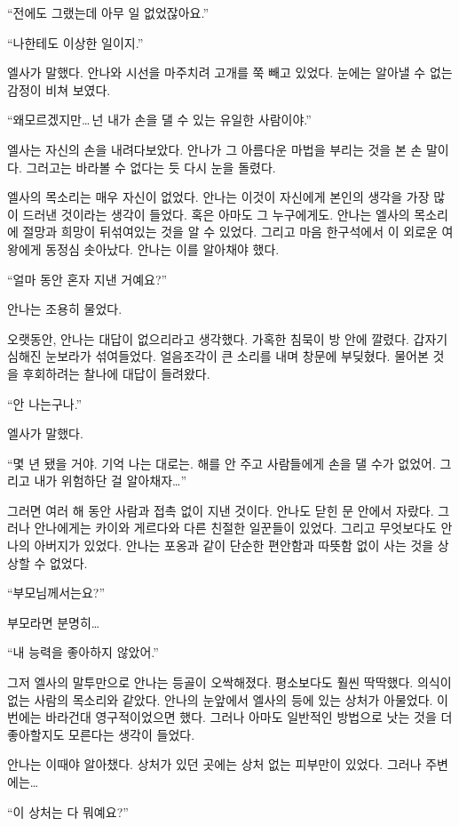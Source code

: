 ``전에도 그랬는데 아무 일 없었잖아요.''

``나한테도 이상한 일이지.''

엘사가 말했다. 안나와 시선을 마주치려 고개를 쭉 빼고 있었다. 눈에는 알아낼 수 없는 감정이 비쳐 보였다.

``왜 모르겠지만\ldots\,넌 내가 손을 댈 수 있는 유일한 사람이야.''

엘사는 자신의 손을 내려다보았다. 안나가 그 아름다운 마법을 부리는 것을 본 손 말이다. 그러고는 바라볼 수 없다는 듯 다시 눈을 돌렸다.

엘사의 목소리는 매우 자신이 없었다. 안나는 이것이 자신에게 본인의 생각을 가장 많이 드러낸 것이라는 생각이 들었다. 혹은 아마도 그 누구에게도. 안나는 엘사의 목소리에 절망과 희망이 뒤섞여있는 것을 알 수 있었다. 그리고 마음 한구석에서 이 외로운 여왕에게 동정심 솟아났다. 안나는 이를 알아채야 했다.

``얼마 동안 혼자 지낸 거예요?''

안나는 조용히 물었다.

오랫동안, 안나는 대답이 없으리라고 생각했다. 가혹한 침묵이 방 안에 깔렸다. 갑자기 심해진 눈보라가 섞여들었다. 얼음조각이 큰 소리를 내며 창문에 부딪혔다. 물어본 것을 후회하려는 찰나에 대답이 들려왔다.

`` 안 나는구나.''

엘사가 말했다.

``몇 년 됐을 거야. 기억 나는 대로는. 해를 안 주고 사람들에게 손을 댈 수가 없었어. 그리고 내가 위험하단 걸 알아채자\ldots''

그러면 여러 해 동안 사람과 접촉 없이 지낸 것이다. 안나도 닫힌 문 안에서 자랐다. 그러나 안나에게는 카이와 게르다와 다른 친절한 일꾼들이 있었다. 그리고 무엇보다도 안나의 아버지가 있었다. 안나는 포옹과 같이 단순한 편안함과 따뜻함 없이 사는 것을 상상할 수 없었다.

``부모님께서는요?''

부모라면 분명히\ldots

``내 능력을 좋아하지 않았어.''

그저 엘사의 말투만으로 안나는 등골이 오싹해졌다. 평소보다도 훨씬 딱딱했다. 의식이 없는 사람의 목소리와 같았다. 안나의 눈앞에서 엘사의 등에 있는 상처가 아물었다. 이번에는 바라건대 영구적이었으면 했다. 그러나 아마도 일반적인 방법으로 낫는 것을 더 좋아할지도 모른다는 생각이 들었다.

안나는 이때야 알아챘다. 상처가 있던 곳에는 상처 없는 피부만이 있었다. 그러나 주변에는\ldots

``이 상처는 다 뭐예요?''


